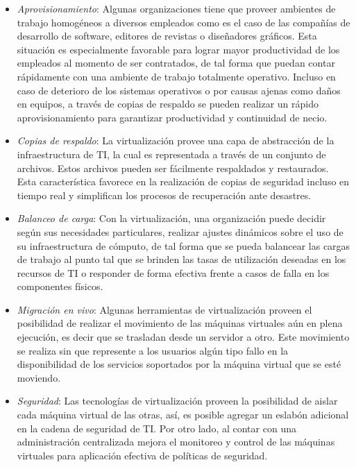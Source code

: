 \begin{itemize}
\begin{itemize}
		\item \textit{Aprovisionamiento}: Algunas organizaciones tiene que proveer ambientes de trabajo homogéneos a diversos empleados como es el caso de las compañías de desarrollo de software, editores de revistas o diseñadores gráficos. Esta situación es especialmente favorable para lograr mayor productividad de los empleados al momento de ser contratados, de tal forma que puedan contar rápidamente con una ambiente de trabajo totalmente operativo. Incluso en caso de deterioro de los sistemas operativos o por causas ajenas como daños en equipos, a través de copias de respaldo se pueden realizar un rápido aprovisionamiento para garantizar productividad y continuidad de necio.\\  
		
		\item \textit{Copias de respaldo}: La virtualización provee una capa de abstracción de la infraestructura de TI, la cual es representada a través de un conjunto de  archivos. Estos archivos pueden ser fácilmente respaldados y restaurados. Esta característica favorece en la realización de copias de seguridad incluso en tiempo real y simplifican los procesos de recuperación ante desastres.\\
		
		\item \textit{Balanceo de carga}: Con la virtualización, una organización puede decidir según sus necesidades particulares, realizar ajustes dinámicos sobre el uso de su infraestructura de cómputo, de tal forma que se pueda balancear las cargas de trabajo al punto tal que se brinden las tasas de utilización deseadas en los recursos de TI o responder de forma efectiva frente a casos de falla en los componentes físicos.\\
		
		\item \textit{Migración en vivo}: Algunas herramientas de virtualización proveen el posibilidad de realizar el movimiento de las máquinas virtuales aún en plena ejecución, es decir que se trasladan desde un servidor a otro. Este movimiento se realiza sin que represente a los usuarios algún tipo fallo en la disponibilidad de los servicios soportados por la máquina virtual que se esté moviendo. \\
				
		\item \textit{Seguridad}: Las tecnologías de virtualización proveen la posibilidad de aislar cada máquina virtual de las otras, así, es posible agregar un eslabón adicional en la cadena de seguridad de TI. Por otro lado, al contar con una administración centralizada mejora el monitoreo y control de las máquinas virtuales para aplicación efectiva de políticas de seguridad.\\
		

\end{itemize}
\end{itemize}
